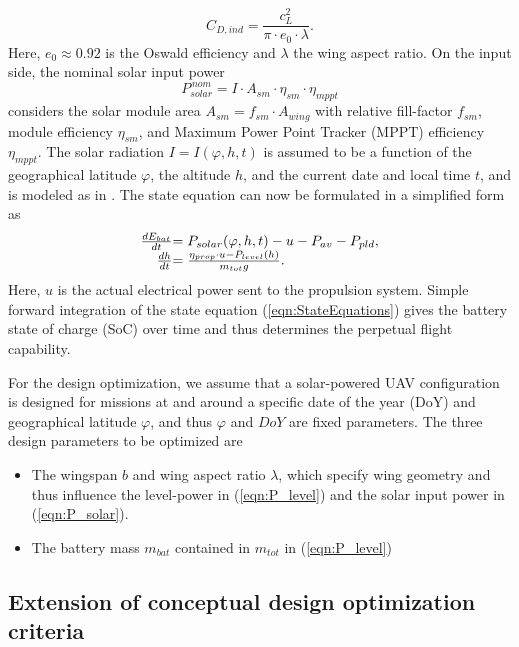 \begin{equation} \label{eqn:C_D}
C_{D,ind}=\frac{c_L^2}{\pi\cdot e_0\cdot\lambda} .
\end{equation}
Here, $e_0\approx0.92$ is the Oswald efficiency and $\lambda$ the wing aspect ratio. On the input side, the nominal solar input power
\begin{equation} \label{eqn:P_solar}
P_{solar}^{\,nom}=I\cdot A_{sm}\cdot\eta_{sm}\cdot\eta_{mppt}
\end{equation}
considers the solar module area $A_{sm}=f_{sm}\cdot A_{wing}$ with relative fill-factor $f_{sm}$, module efficiency $\eta_{sm}$, and Maximum Power Point Tracker (MPPT) efficiency $\eta_{mppt}$. The solar radiation $I=I(\varphi,h,t)$ is assumed to be a function of the geographical latitude $\varphi$, the altitude $h$, and the current date and local time $t$, and is modeled as in \cite{Duffie_SolarEngineering}.
The state equation can now be formulated in a simplified form as
\begin{equation}\label{eqn:StateEquations}
\begin{array}{r@{}l}
\frac{dE_{bat}}{dt}&=P_{solar}(\varphi,h,t)-u-P_{av}-P_{pld},\\
\frac{dh}{dt}&=\frac{\eta_{prop}\cdot u-P_{level}(h)}{m_{tot}g} .
\end{array}
\end{equation}
Here, $u$ is the actual electrical power sent to the propulsion system. Simple forward integration of the state equation (\ref{eqn:StateEquations}) gives the battery state of charge (SoC) over time and thus determines the perpetual flight capability.

For the design optimization, we assume that a solar-powered UAV configuration is designed for missions at and around a specific date of the year (DoY) and geographical latitude $\varphi$, and thus $\varphi$ and $DoY$ are fixed parameters. The three design parameters to be optimized are
\begin{itemize}
\item The wingspan $b$ and wing aspect ratio $\lambda$, which specify wing geometry and thus influence the level-power in (\ref{eqn:P_level}) and the solar input power in (\ref{eqn:P_solar}).
\item The battery mass $m_{bat}$ contained in $m_{tot}$ in (\ref{eqn:P_level}) 
\end{itemize}

\subsection{Extension of conceptual design optimization criteria}

